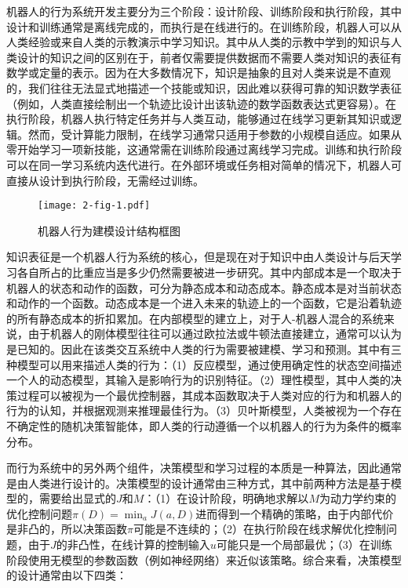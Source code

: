 机器人的行为系统开发主要分为三个阶段：设计阶段、训练阶段和执行阶段，其中设计和训练通常是离线完成的，而执行是在线进行的。在训练阶段，机器人可以从人类经验或来自人类的示教演示中学习知识。其中从人类的示教中学到的知识与人类设计的知识之间的区别在于，前者仅需要提供数据而不需要人类对知识的表征有数学或定量的表示。因为在大多数情况下，知识是抽象的且对人类来说是不直观的，我们往往无法显式地描述一个技能或知识，因此难以获得可靠的知识数学表征（例如，人类直接绘制出一个轨迹比设计出该轨迹的数学函数表达式更容易）。在执行阶段，机器人执行特定任务并与人类互动，能够通过在线学习更新其知识或逻辑。然而，受计算能力限制，在线学习通常只适用于参数的小规模自适应。如果从零开始学习一项新技能，这通常需在训练阶段通过离线学习完成。训练和执行阶段可以在同一学习系统内迭代进行。在外部环境或任务相对简单的情况下，机器人可直接从设计到执行阶段，无需经过训练。

\begin{figure}[h]
    \centering
    \texttt{[image: 2-fig-1.pdf]}
    \caption{机器人行为建模设计结构框图}
    \label{fig:2-1}
\end{figure}
知识表征是一个机器人行为系统的核心，但是现在对于知识中由人类设计与后天学习各自所占的比重应当是多少仍然需要被进一步研究。其中内部成本是一个取决于机器人的状态和动作的函数，可分为静态成本和动态成本。静态成本是对当前状态和动作的一个函数。动态成本是一个进入未来的轨迹上的一个函数，它是沿着轨迹的所有静态成本的折扣累加。在内部模型的建立上，对于人-机器人混合的系统来说，由于机器人的刚体模型往往可以通过欧拉法或牛顿法直接建立，通常可以认为是已知的。因此在该类交互系统中人类的行为需要被建模、学习和预测\cite{liuDesigningRobotBehavior,araiAssessmentOperatorStress2010,xinxuHumanBehaviorUnderstanding2010}。其中有三种模型可以用来描述人类的行为：（1）反应模型，通过使用确定性的状态空间描述一个人的动态模型，其输入是影响行为的识别特征。（2）理性模型，其中人类的决策过程可以被视为一个最优控制器，其成本函数取决于人类对应的行为和机器人的行为的认知，并根据观测来推理最佳行为。（3）贝叶斯模型，人类被视为一个存在不确定性的随机决策智能体，即人类的行动遵循一个以机器人的行为为条件的概率分布。

而行为系统中的另外两个组件，决策模型和学习过程的本质是一种算法，因此通常是由人类进行设计的。决策模型的设计通常由三种方式，其中前两种方法是基于模型的，需要给出显式的$J$和$M$：（1）在设计阶段，明确地求解以$M$为动力学约束的优化控制问题$\pi(D)=\min_a J(a,D)$进而得到一个精确的策略，由于内部代价是非凸的，所以决策函数$\pi$可能是不连续的；（2）在执行阶段在线求解优化控制问题，由于$J$的非凸性，在线计算的控制输入$u$可能只是一个局部最优；（3）在训练阶段使用无模型的参数函数（例如神经网络）来近似该策略。综合来看，决策模型的设计通常由以下四类：

